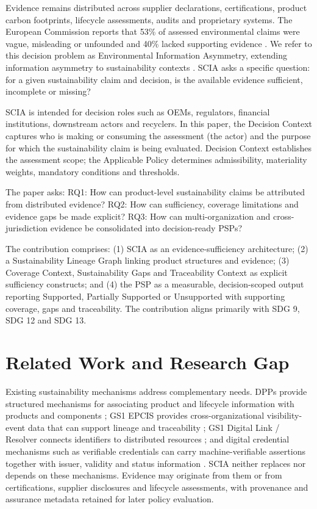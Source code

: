 \documentclass[english]{lni}
\begin{document}
Evidence remains distributed across supplier declarations, certifications, product carbon footprints, lifecycle assessments, audits and proprietary systems. The European Commission reports that 53\% of assessed environmental claims were vague, misleading or unfounded and 40\% lacked supporting evidence \cite{EC23}. We refer to this decision problem as Environmental Information Asymmetry, extending information asymmetry to sustainability contexts \cite{Ak70}. SCIA asks a specific question: for a given sustainability claim and decision, is the available evidence sufficient, incomplete or missing?

SCIA is intended for decision roles such as OEMs, regulators, financial institutions, downstream actors and recyclers. In this paper, the Decision Context captures who is making or consuming the assessment (the actor) and the purpose for which the sustainability claim is being evaluated. Decision Context establishes the assessment scope; the Applicable Policy determines admissibility, materiality weights, mandatory conditions and thresholds.

The paper asks: RQ1: How can product-level sustainability claims be attributed from distributed evidence? RQ2: How can sufficiency, coverage limitations and evidence gaps be made explicit? RQ3: How can multi-organization and cross-jurisdiction evidence be consolidated into decision-ready PSPs?

The contribution comprises: (1) SCIA as an evidence-sufficiency architecture; (2) a Sustainability Lineage Graph linking product structures and evidence; (3) Coverage Context, Sustainability Gaps and Traceability Context as explicit sufficiency constructs; and (4) the PSP as a measurable, decision-scoped output reporting Supported, Partially Supported or Unsupported with supporting coverage, gaps and traceability. The contribution aligns primarily with SDG 9, SDG 12 and SDG 13.

\section{Related Work and Research Gap}
Existing sustainability mechanisms address complementary needs. DPPs provide structured mechanisms for associating product and lifecycle information with products and components \cite{EU24,CI24}; GS1 EPCIS provides cross-organizational visibility-event data that can support lineage and traceability \cite{GS1E}; GS1 Digital Link / Resolver connects identifiers to distributed resources \cite{GS1R}; and digital credential mechanisms such as verifiable credentials can carry machine-verifiable assertions together with issuer, validity and status information \cite{W3C25}. SCIA neither replaces nor depends on these mechanisms. Evidence may originate from them or from certifications, supplier disclosures and lifecycle assessments, with provenance and assurance metadata retained for later policy evaluation.
\end{document}
